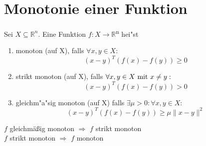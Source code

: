 	\section{Monotonie einer Funktion}
	
	\begin{definition}[Monotonie]
		Sei $X\subseteq\mathbb{R}^n$. Eine Funktion $f : X \rightarrow \mathbb{R}$\textsuperscript{n} hei"st
		\begin{enumerate}
			\item monoton (auf X), falls $\forall x,y \in X:$
			\begin{equation*}
			(x-y)^T(f(x)-f(y)) \geq 0
			\end{equation*}
			\item strikt monoton (auf X), falls $\forall x,y \in X \ \textnormal{mit} \ x \neq y:$
			\begin{equation*}
			(x-y)^T(f(x)-f(y)) > 0
			\end{equation*}
			\item gleichm"a"sig monoton (auf X) falls $\exists \mu > 0 : \forall x,y \in X:$
			\begin{equation*}
			(x-y)^T(f(x)-f(y)) \geq \mu \| x-y \|^2
			\end{equation*}
		\end{enumerate}
	\end{definition}
	
	\begin{bemerkung}
		$f$ gleichmäßig monoton \( \Rightarrow \) $f$ strikt monoton \\ 
		$f$ strikt monoton \( \Rightarrow \) $f$ monoton
	\end{bemerkung}
	
